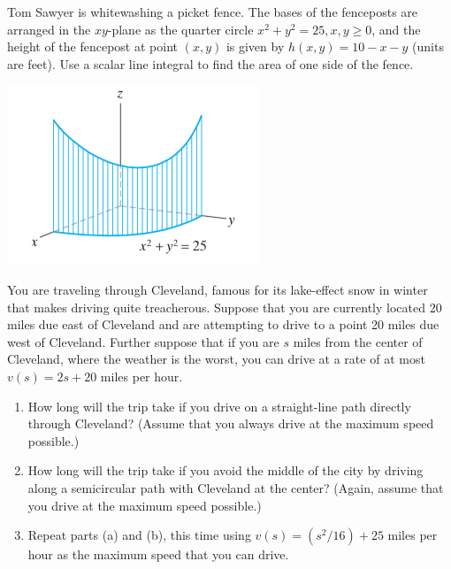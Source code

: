\documentclass[11pt,letterpaper,boxed]{hmcpset}
\begin{document}
\begin{solution}
\vfill
\end{solution}
\newpage

\begin{problem}[Colley 6.1 \#34]
Tom Sawyer is whitewashing a picket fence. The bases of the fenceposts are arranged 
in the $xy$-plane as the quarter circle $x^2+y^2 =25,x,y\geq0$, and the height of the fencepost at point $(x,y)$ is given by $h(x,y)=10-x-y$ (units are feet). Use a scalar line integral 
to find the area of one side of the fence.
\begin{center}
\includegraphics[scale=0.6]{sawyer.png}
\end{center}
\end{problem}

\begin{solution}
\vfill
\end{solution}
\newpage

\begin{problem}[Colley 6.1 \#40]
You are traveling through Cleveland, famous for its lake-effect snow in winter that makes driving quite treacherous. 
Suppose that you are currently located 20 miles due east of Cleveland and are attempting to drive to a 
point 20 miles due west of Cleveland. Further suppose that if you are $s$ miles from the center of Cleveland,
 where the weather is the worst, you can drive at a rate of at most $v(s) = 2s +20$ miles per hour.
 \begin{enumerate}
 \item How long will the trip take if you drive on a straight-line path directly through Cleveland? (Assume that you always drive at the maximum speed possible.)
 \item How long will the trip take if you avoid the middle of the city by driving along a semicircular path with Cleveland at the center? (Again, assume that you drive at the maximum speed possible.)
 \item Repeat parts (a) and (b), this time using $v(s) =
(s^2/16) + 25$ miles per hour as the maximum speed that you can drive.
 \end{enumerate}
\end{problem}
\end{document}
